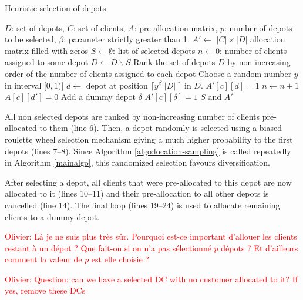 \documentclass[a4paper,10pt]{article}
\begin{document}
\begin{linenumbers}
\begin{algorithm}
	\caption{Heuristic selection of depots}
	\label{algo:location-sampling}
	\begin{algorithmic}[1]
		\REQUIRE $D$: set of depots, $C$: set of clients, $A$: pre-allocation matrix, $p$: number of depots to be selected, $\beta$: parameter strictly greater than 1.
		\STATE  $A' \leftarrow$  $|C| \times |D|$ allocation matrix filled with zeros
		\STATE $S \leftarrow \emptyset$: list of selected depots
		\STATE $n \leftarrow 0$: number of clients assigned to some depot
			\STATE $ D \leftarrow D \backslash S$
			\STATE Rank the set of depots $D$ by non-increasing order of the number of clients assigned to each depot
			\STATE Choose a random number $y$ in interval $[0,1)$]
			\STATE $d \leftarrow$ depot at position $\lceil y^\beta \; |D| \; \rceil$ in $D$.
					\STATE $A'[c][d] = 1$
					\STATE $n \leftarrow n+1$
						\STATE $A[c][d'] = 0$ 
					\ENDFOR
				\ENDIF		
			\ENDFOR
		\ENDWHILE
			\STATE Add a dummy depot $\delta$
				\STATE $A'[c][\delta]=1$
			\ENDFOR
		\ENDIF
		\RETURN $S$ and $A'$
	\end{algorithmic}
\end{algorithm}

All non selected depots are ranked by non-increasing number of clients pre-allocated to them (line 6).
Then, a depot randomly is selected using a biased roulette wheel selection mechanism giving a much higher probability to the first depots (lines 7--8). 
Since Algorithm \ref{algo:location-sampling} is called repeatedly in Algorithm \ref{mainalgo}, this randomized selection favours diversification. 

After selecting a depot, all clients that were pre-allocated to this depot are now allocated to it (lines 10--11) 
and their pre-allocation to all other depots is cancelled (line 14). 
The final loop (lines 19--24) is used to allocate remaining clients to a dummy depot. 

\textcolor{red}{Olivier: Là je ne suis plus très sûr. Pourquoi est-ce important d'allouer les clients restant à un dépot ? Que fait-on si on n'a pas sélectionné $p$ dépots ? Et d'ailleurs comment la valeur de $p$ est elle choisie ? }

\textcolor{red}{Olivier: Question: can we have a selected DC with no customer allocated to it? If yes, remove these DCs}



\end{linenumbers}
\end{document}
